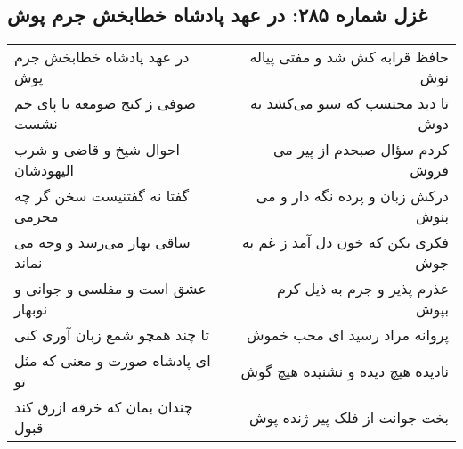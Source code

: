\begin{center}
\section*{غزل شماره ۲۸۵: در عهد پادشاه خطابخش جرم پوش}
\label{sec:sh285}
\begin{longtable}{l p{0.5cm} r}
در عهد پادشاه خطابخش جرم پوش
&&
حافظ قرابه کش شد و مفتی پیاله نوش
\\
صوفی ز کنج صومعه با پای خم نشست
&&
تا دید محتسب که سبو می‌کشد به دوش
\\
احوال شیخ و قاضی و شرب الیهودشان
&&
کردم سؤال صبحدم از پیر می فروش
\\
گفتا نه گفتنیست سخن گر چه محرمی
&&
درکش زبان و پرده نگه دار و می بنوش
\\
ساقی بهار می‌رسد و وجه می نماند
&&
فکری بکن که خون دل آمد ز غم به جوش
\\
عشق است و مفلسی و جوانی و نوبهار
&&
عذرم پذیر و جرم به ذیل کرم بپوش
\\
تا چند همچو شمع زبان آوری کنی
&&
پروانه مراد رسید ای محب خموش
\\
ای پادشاه صورت و معنی که مثل تو
&&
نادیده هیچ دیده و نشنیده هیچ گوش
\\
چندان بمان که خرقه ازرق کند قبول
&&
بخت جوانت از فلک پیر ژنده پوش
\\
\end{longtable}
\end{center}
